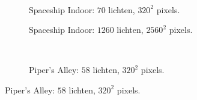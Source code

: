 \begin{figure}[t]
\begin{subfigure}[b]{\textwidth}
  \end{subfigure}\hfill\\
  \begin{adjustbox}{minipage=\textwidth, scale=0.55}
    \begin{subfigure}[b]{0.8\textwidth}
      \centering
      \def\svgwidth{\textwidth}
      
      \caption{Spaceship Indoor: $70$ lichten, $320^2$ pixels.}
      \label{fig:cs-frames-stacked:indoor-70}
    \end{subfigure}
  \end{adjustbox}\hspace{-0.075\textwidth}  %
  \begin{adjustbox}{minipage=\textwidth, scale=0.55}
    \begin{subfigure}[b]{0.8\textwidth}
      \centering
      \def\svgwidth{\textwidth}
      
      \caption{Spaceship Indoor: $1260$ lichten, $2560^2$ pixels.}
      \label{fig:cs-frames-stacked:indoor-2560}
    \end{subfigure}
  \end{adjustbox} \\
  \begin{adjustbox}{minipage=\textwidth, scale=0.55}
    \begin{subfigure}[b]{0.8\textwidth}
      \centering
      \def\svgwidth{\textwidth}
      
      \caption{Piper's Alley: $58$ lichten, $320^2$ pixels.}
      \label{fig:cs-frames-stacked:alley-320}
    \end{subfigure}
  \end{adjustbox}\hspace{-0.075\textwidth}  %
  \begin{adjustbox}{minipage=\textwidth, scale=0.55}

\end{adjustbox}
\end{figure}
